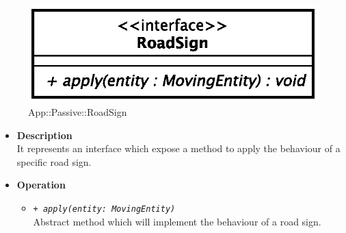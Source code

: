 \begin{figure}[h]
\centering
\includegraphics[scale=0.6,keepaspectratio]{images/solution/road_sign.eps}
\caption{App::Passive::RoadSign}
\label{fig:sd-app-roadsign}
\end{figure}
\FloatBarrier
\begin{itemize}
  \item \textbf{Description} \\
    It represents an interface which expose a method to apply the behaviour of a specific road sign.
  \item \textbf{Operation}
  \begin{itemize} 
    \item \texttt{\textit{+ apply(entity: MovingEntity)}} \\
Abstract method which will implement the behaviour of a road sign.
  \end{itemize}
\end{itemize}
